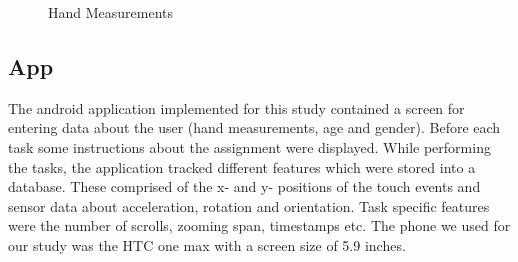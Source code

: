 \documentclass{sigchi}
\begin{document}
\begin{figure}
\caption{Hand Measurements}
\end{figure} 

\subsection{App}
The android application implemented for this study contained a screen for entering data about the user (hand measurements, age and gender). Before each task some instructions about the assignment were displayed. While performing the tasks, the application tracked different features which were stored into a database. These comprised of the x- and y- positions of the touch events and sensor data about acceleration, rotation and orientation. Task specific features were the number of scrolls, zooming span, timestamps etc. The phone we used for our study was the HTC one max with a screen size of 5.9 inches.
\end{document}
